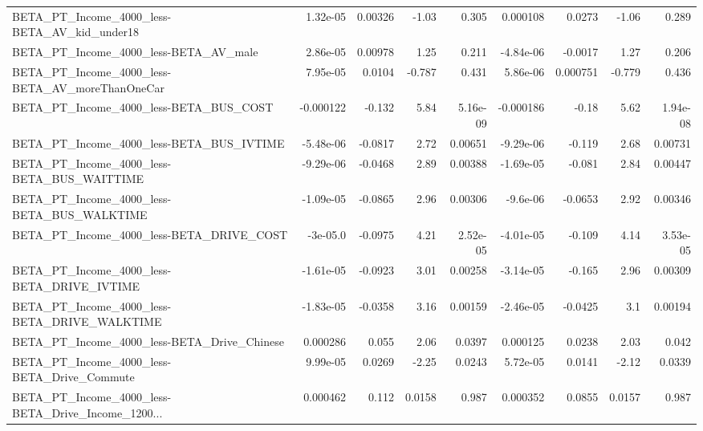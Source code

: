 \begin{tabular}{lrrrrrrrr}
BETA\_PT\_Income\_4000\_less-BETA\_AV\_kid\_under18       &    1.32e-05 &      0.00326 &    -1.03 &    0.305 &   0.000108 &      0.0273 &        -1.06 &         0.289 \\
BETA\_PT\_Income\_4000\_less-BETA\_AV\_male              &    2.86e-05 &      0.00978 &     1.25 &    0.211 &  -4.84e-06 &     -0.0017 &         1.27 &         0.206 \\
BETA\_PT\_Income\_4000\_less-BETA\_AV\_moreThanOneCar    &    7.95e-05 &       0.0104 &   -0.787 &    0.431 &   5.86e-06 &    0.000751 &       -0.779 &         0.436 \\
BETA\_PT\_Income\_4000\_less-BETA\_BUS\_COST             &   -0.000122 &       -0.132 &     5.84 & 5.16e-09 &  -0.000186 &       -0.18 &         5.62 &      1.94e-08 \\
BETA\_PT\_Income\_4000\_less-BETA\_BUS\_IVTIME           &   -5.48e-06 &      -0.0817 &     2.72 &  0.00651 &  -9.29e-06 &      -0.119 &         2.68 &       0.00731 \\
BETA\_PT\_Income\_4000\_less-BETA\_BUS\_WAITTIME         &   -9.29e-06 &      -0.0468 &     2.89 &  0.00388 &  -1.69e-05 &      -0.081 &         2.84 &       0.00447 \\
BETA\_PT\_Income\_4000\_less-BETA\_BUS\_WALKTIME         &   -1.09e-05 &      -0.0865 &     2.96 &  0.00306 &   -9.6e-06 &     -0.0653 &         2.92 &       0.00346 \\
BETA\_PT\_Income\_4000\_less-BETA\_DRIVE\_COST           &    -3e-05.0 &      -0.0975 &     4.21 & 2.52e-05 &  -4.01e-05 &      -0.109 &         4.14 &      3.53e-05 \\
BETA\_PT\_Income\_4000\_less-BETA\_DRIVE\_IVTIME         &   -1.61e-05 &      -0.0923 &     3.01 &  0.00258 &  -3.14e-05 &      -0.165 &         2.96 &       0.00309 \\
BETA\_PT\_Income\_4000\_less-BETA\_DRIVE\_WALKTIME       &   -1.83e-05 &      -0.0358 &     3.16 &  0.00159 &  -2.46e-05 &     -0.0425 &          3.1 &       0.00194 \\
BETA\_PT\_Income\_4000\_less-BETA\_Drive\_Chinese        &    0.000286 &        0.055 &     2.06 &   0.0397 &   0.000125 &      0.0238 &         2.03 &         0.042 \\
BETA\_PT\_Income\_4000\_less-BETA\_Drive\_Commute        &    9.99e-05 &       0.0269 &    -2.25 &   0.0243 &   5.72e-05 &      0.0141 &        -2.12 &        0.0339 \\
BETA\_PT\_Income\_4000\_less-BETA\_Drive\_Income\_1200... &    0.000462 &        0.112 &   0.0158 &    0.987 &   0.000352 &      0.0855 &       0.0157 &         0.987 \\

\end{tabular}
